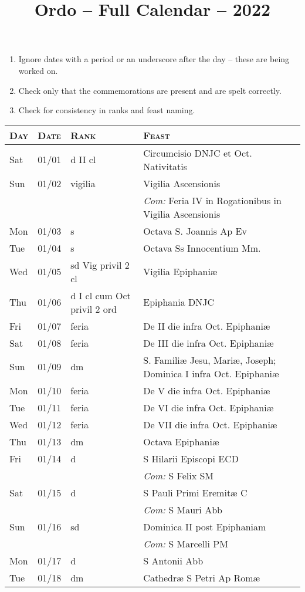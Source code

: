 \documentclass[10pt]{article}
\title{Ordo -- Full Calendar -- 2022}
\begin{document}
\begin{enumerate}
    \item Ignore dates with a period or an underscore after the day -- these are being worked on.
    \item Check only that the commemorations are present and are spelt correctly.
    \item Check for consistency in ranks and feast naming.
\end{enumerate}
\begin{longtable}{ l l l l }
\hline
\textsc{Day} & \textsc{Date} & \textsc{Rank} & \textsc{Feast} \\
\hline
\endhead
Sat & 01/01 & d II cl & Circumcisio DNJC et Oct. Nativitatis\\
Sun & 01/02 & vigilia & Vigilia Ascensionis\\
 & & & \textit{Com:} Feria IV in Rogationibus in Vigilia Ascensionis \\
Mon & 01/03 & s & Octava S. Joannis Ap Ev\\
Tue & 01/04 & s & Octava Ss Innocentium Mm.\\
Wed & 01/05 & sd Vig privil 2 cl & Vigilia Epiphaniæ\\
Thu & 01/06 & d I cl cum Oct privil 2 ord & Epiphania DNJC\\
Fri & 01/07 & feria & De II die infra Oct. Epiphaniæ\\
Sat & 01/08 & feria & De III die infra Oct. Epiphaniæ\\
Sun & 01/09 & dm & S. Familiæ Jesu, Mariæ, Joseph; Dominica I infra Oct. Epiphaniæ\\
Mon & 01/10 & feria & De V die infra Oct. Epiphaniæ\\
Tue & 01/11 & feria & De VI die infra Oct. Epiphaniæ\\
Wed & 01/12 & feria & De VII die infra Oct. Epiphaniæ\\
Thu & 01/13 & dm & Octava Epiphaniæ\\
Fri & 01/14 & d & S Hilarii Episcopi ECD\\
 & & & \textit{Com:} S Felix SM\\
Sat & 01/15 & d & S Pauli Primi Eremitæ C\\
 & & & \textit{Com:} S Mauri Abb\\
Sun & 01/16 & sd & Dominica II post Epiphaniam\\
 & & & \textit{Com:} S Marcelli PM\\
Mon & 01/17 & d & S Antonii Abb\\
Tue & 01/18 & dm & Cathedræ S Petri Ap Romæ\\

\end{longtable}
\end{document}
